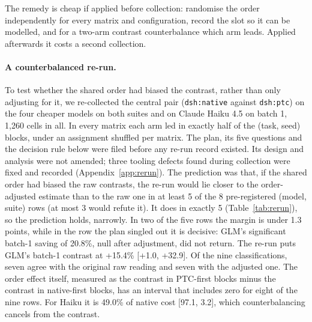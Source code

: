 \documentclass[10pt]{article}
\newcommand*{\mi}{\textminus}   %
\begin{document}
The remedy is cheap if applied before collection: randomise the order independently for every matrix
and configuration, record the slot so it can be modelled, and for a two-arm contrast counterbalance
which arm leads. Applied afterwards it costs a second collection.

\paragraph{A counterbalanced re-run.} To test whether the shared order had biased the contrast, rather
than only adjusting for it, we re-collected the central pair (\texttt{dsh:native} against
\texttt{dsh:ptc}) on the four cheaper models on both suites and on Claude Haiku 4.5 on batch 1, 1,260
cells in all. In every matrix each arm led in exactly half of the (task, seed) blocks, under an
assignment shuffled per matrix. The plan, its five questions and the decision rule below were filed
before any re-run record existed. Its design and analysis were not amended; three tooling defects
found during collection were fixed and recorded (Appendix~\ref{app:rerun}). The prediction was
that, if the shared order had biased the raw contrasts, the re-run would lie closer to the
order-adjusted estimate than to the raw one in at least 5 of the 8 pre-registered (model, suite) rows
(at most 3 would refute it). It does in exactly 5 (Table~\ref{tab:rerun}), so the prediction holds,
narrowly. In two of the five rows the margin is under 1.3 points, while in the row the plan singled out
it is decisive: GLM's significant batch-1 saving of \mi{}20.8\%, null after adjustment, did
not return. The re-run puts GLM's batch-1 contrast at +15.4\% [+1.0, +32.9]. Of the nine
classifications, seven agree with the original raw reading and seven with the adjusted one. The order
effect itself, measured as the contrast in PTC-first blocks minus the contrast in native-first blocks,
has an interval that includes zero for eight of the nine rows. For Haiku it is \mi{}49.0\% of native
cost [\mi{}97.1, \mi{}3.2], which counterbalancing cancels from the contrast.
\end{document}
